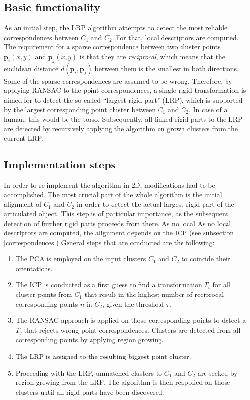 \subsection{Basic functionality}
\label{functionalityLRP}
As an initial step, the LRP algorithm  attempts to detect the most reliable correspondences between $C_1$ and $C_2$. For that, local descriptors are computed. The requirement for a sparse correspondence between two cluster points $\boldsymbol{p}_i(x,y)$ and $\boldsymbol{p}_j(x,y)$ is that they are \textit{reciprocal}, which means that the euclidean distance $d(\boldsymbol{p}_i,\boldsymbol{p}_j)$ between them is the smallest in both directions. Some of the sparse correspondences are assumed to be wrong. Therefore, by applying RANSAC to the point correspondences, a single rigid transformation is aimed for to detect the so-called ``largest rigid part'' (LRP), which is supported by the largest corresponding point cluster between $C_1$ and $C_2$. In case of a human, this would be the torso. Subsequently, all linked rigid parts to the LRP are detected by recursively applying the algorithm on grown clusters from the current LRP.

\subsection{Implementation steps}

In order to re-implement the algorithm in 2D, modifications had to be accomplished. The most crucial part of the whole algorithm is the initial alignment of $C_1$ and $C_2$ in order to detect the actual largest rigid part of the articulated object. This step is of particular importance, as the subsequent detection of further rigid parts proceeds from there. As no local As no local descriptors are computed, the alignment depends on the ICP (see subsection \ref{correspondences}) General steps that are conducted are the following: 

\begin{enumerate}
	\item The PCA is employed on the input clusters $C_1$ and $C_2$ to coincide their orientations. 
	\item The ICP is conducted as a first guess to find a transformation $T_i$ for all cluster points from $C_1$ that result in the highest number of reciprocal corresponding points $n$ in $C_2$, given the threshold $\tau$.
	\item The RANSAC approach is applied on those corresponding points to detect a $T_j$ that rejects wrong point correspondences. Clusters are detected from all corresponding points by applying region growing.
	\item The LRP is assigned to the resulting biggest point cluster.
	\item Proceeding with the LRP, unmatched clusters to $C_1$ and $C_2$ are seeked by region growing from the LRP. The algorithm is then reapplied on those clusters until all rigid parts have been discovered.
\end{enumerate}

